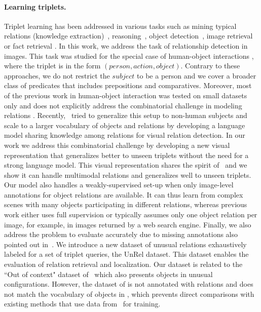 \documentclass[10pt,twocolumn,letterpaper]{article}
\newcommand{\spaceparagraph}{\vspace{-.35cm}}
\begin{document}
\spaceparagraph
\paragraph{Learning triplets.} 
Triplet learning has been addressed in various tasks such as mining typical relations (knowledge extraction)~\cite{chen2013neil,sadeghi2015viske,yatskar2016stating,Zhu2014}, reasoning~\cite{jenatton2012,Movshovitz-attias,Socher2013b}, object detection~\cite{Gupta08,Sadeghi2011}, image retrieval~\cite{Johnson15a} or fact retrieval \cite{elhoseiny2015sherlock}. In this work, we address the task of relationship detection in images. This task was studied for the special case of human-object interactions \cite{Delaitre11,Desai2010,Gupta2009,Prest12,ramanathan15,Yao2010,Yao2010a,Yao11}, where the triplet is in the form $(person, action, object)$. Contrary to these approaches, we do not restrict the $subject$ to be a person and we cover a broader class of predicates that includes prepositions and comparatives. Moreover, most of the previous work in human-object interaction was tested on small datasets only and does not explicitly address the combinatorial challenge in modeling relations \cite{Sadeghi2011}. Recently,~\cite{Lu16} tried to generalize this setup to non-human subjects and scale to a larger vocabulary of objects and relations by developing a language model sharing knowledge among relations for visual relation detection. In our work we address this combinatorial challenge by developing a new visual representation that generalizes better to unseen triplets without the need for a strong language model. This visual representation shares the spirit of~\cite{galleguillos2008object,Johnson15a,li2012automatic} and we show it can handle multimodal relations and generalizes well to unseen triplets. Our model also handles a weakly-supervised set-up when only image-level annotations for object relations are available. It can thus learn from complex scenes with many objects participating in different relations, whereas previous work either uses full supervision or typically assumes only one object relation per image, for example, in images returned by a web search engine. 
Finally, we also address the problem to evaluate accurately due to missing annotations also pointed out in~\cite{elhoseiny2015sherlock,Lu16}. We introduce a new dataset of unusual relations exhaustively labeled for a set of triplet queries, the UnRel dataset. This dataset enables the evaluation of relation retrieval and localization. 
Our dataset is related to the ``Out of context" dataset of~\cite{Choi2012} which also presents objects in unusual configurations. However, the dataset of \cite{Choi2012} is not annotated with relations and does not match the vocabulary of objects in \cite{Lu16}, which prevents direct comparisons with existing methods that use data from~\cite{Lu16} for training.
\end{document}
